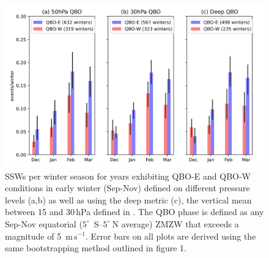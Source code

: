 \begin{figure}[h!]
\begin{center}
\noindent\includegraphics[width = 0.9\linewidth]{Figures/Figures-origins/SSW_histograms_QBOphases.png}
\caption[Histogram of SSWs per winter in different QBO phases in UKESM.]{SSWs per winter season for years exhibiting QBO-E and QBO-W conditions in early winter (Sep-Nov) defined on different pressure levels (a,b) as well as using the deep metric (c), the vertical mean between 15 and 30\,hPa defined in \cite{Andrews2019}. The QBO phase is defined as any Sep-Nov equatorial ($5^{\circ}$\ S--$5^{\circ}\ $N average) ZMZW that exceeds a magnitude of 5\ m\,s$^{-1}$. Error bars on all plots are derived using the same bootstrapping method outlined in figure 1.}
\label{fig:SSW_hist_QBO_phase}
\end{center}
\end{figure}

